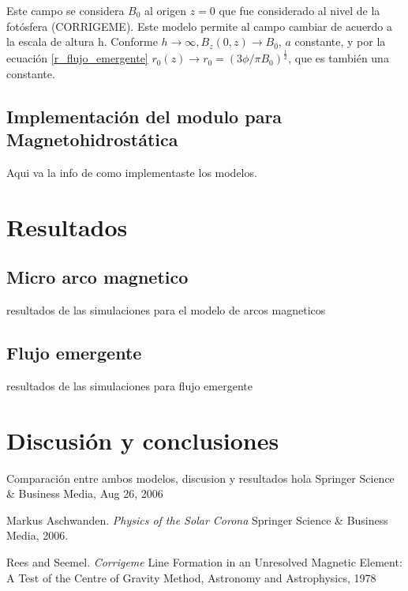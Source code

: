 \documentclass[9pt]{book}
\begin{document}
Este campo se considera $B_0$ al origen $z = 0$ que fue considerado al nivel de la fot\'osfera (CORRIGEME). Este modelo permite al campo cambiar de acuerdo a la escala de altura h.
Conforme $h\rightarrow \infty , B_z(0,z) \rightarrow B_0$, $a$ constante, y por la ecuaci\'on \ref{r_flujo_emergente} $r_0(z) \rightarrow r_0 = (3\phi / \pi B_0)^\frac{1}{2}$, que es tambi\'en una constante.



\section{Implementaci\'on del modulo para Magnetohidrost\'atica}
Aqui va la info de como implementaste los modelos.


\chapter{Resultados}
\section{Micro arco magnetico}
resultados de las simulaciones para el modelo de arcos magneticos
\section{Flujo emergente}
resultados de las simulaciones para flujo emergente


\chapter{Discusi\'on y conclusiones}
Comparaci\'on entre ambos modelos, discusion y resultados
hola Springer Science \& Business Media, Aug 26, 2006

\begin{thebibliography}{9}

Markus Aschwanden. 
\textit{Physics of the Solar Corona} 
Springer Science \& Business Media, 2006.

Rees and Seemel.
\textit{Corrigeme} 
Line Formation in an Unresolved Magnetic Element: A Test of the Centre of Gravity Method, Astronomy and Astrophysics, 1978



\end{thebibliography}
\end{document}
